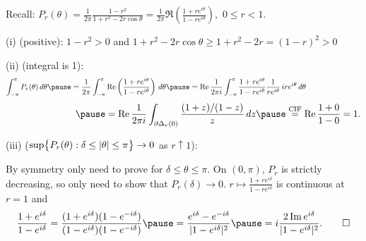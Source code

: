 \documentclass[10pt,aspectratio=169]{beamer}
\begin{document}
\begin{frame}
Recall: $
P_r(\theta)
= \frac{1}{2\pi} \frac{1-r^2}{1+r^2-2r \cos \theta}
= \frac{1}{2\pi}
\Re \left( \frac{1+re^{i\theta}}{1-re^{i\theta}}\right) ,
$
\quad
$0 \leq r < 1$.
\pause
\medskip

(i) (positive): \quad $1-r^2 > 0$
\quad
and
\quad
$1+r^2-2r \cos\theta \geq 1+r^2-2r = {(1-r)}^2 > 0$

\medskip
\pause

(ii) (integral is 1):
\[
\int_{-\pi}^{\pi}
P_r(\theta) \, d\theta
\pause
=
\frac{1}{2\pi}
\int_{-\pi}^{\pi}
\Re
\left(
\frac{1+re^{i\theta}}{1-re^{i\theta}}
\right)
\, d\theta
\pause
=
\Re
\frac{1}{2\pi i}
\int_{-\pi}^{\pi}
\frac{1+re^{i\theta}}{1-re^{i\theta}} \frac{1}{re^{i\theta}} \,
ire^{i\theta}
\, d\theta
\hspace*{1in}
\]
\[
\hspace*{1in}
\pause
= 
\Re
\frac{1}{2\pi i}
\int_{\partial \Delta_r(0)}
\frac{(1+z)/(1-z)}{z} \, dz
\pause
\overset{\text{CIF}}{=}
\Re \frac{1+0}{1-0} = 1 .
\]
\pause

(iii) ($\sup \bigl\{P_r(\theta) : \delta \leq \left\lvert {\theta} \right\rvert \leq
\pi \bigr\} \to 0$ as $r \uparrow 1$):


\pause
By symmetry only need to prove for $\delta \leq \theta \leq \pi$.
\pause
\quad
On $(0,\pi)$, $P_r$ is strictly decreasing, so only need to show
that $P_r(\delta) \to 0$.
\pause
\quad
$r \mapsto
\frac{1+re^{i\delta}}{1-re^{i\delta}}$
is continuous at $r=1$ and \pause
\[
\frac{1+e^{i\delta}}{1-e^{i\delta}}
=
\frac{(1+e^{i\delta})(1-e^{-i\delta})}{(1-e^{i\delta})(1-e^{-i\delta})}
\pause
=
\frac{e^{i\delta}-e^{-i\delta}}{\sabs{1-e^{i\delta}}^2}
\pause
=
i \frac{2\Im e^{i\delta}}{\sabs{1-e^{i\delta}}^2} . \qed
\]
\end{frame}
\end{document}
